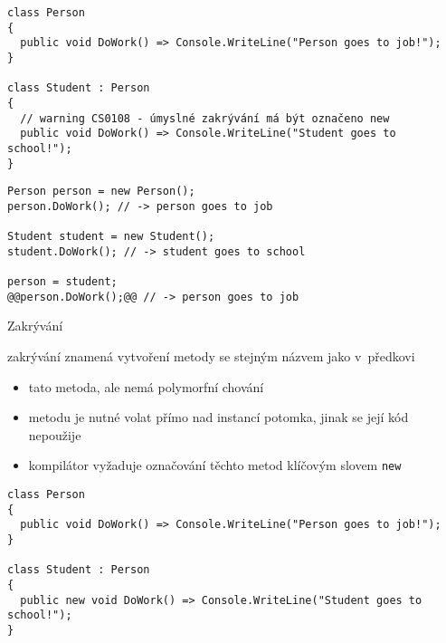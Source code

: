 \begin{frame}[fragile]
\begin{noblock}
\begin{lstlisting}[basicstyle=\small]
class Person
{
  public void DoWork() => Console.WriteLine("Person goes to job!");
}

class Student : Person
{
  // warning CS0108 - úmyslné zakrývání má být označeno new
  public void DoWork() => Console.WriteLine("Student goes to school!");
}
\end{lstlisting}
\end{noblock}
\vfill
\begin{yesblock}
\begin{lstlisting}[basicstyle=\small]
Person person = new Person();
person.DoWork(); // -> person goes to job

Student student = new Student();
student.DoWork(); // -> student goes to school

person = student;
@@person.DoWork();@@ // -> person goes to job 
\end{lstlisting}
\end{yesblock}
\end{frame}



\begin{frame}[fragile]
\begin{bitemize}{Zakrývání}
\item zakrývání znamená vytvoření metody se stejným názvem jako v~předkovi
\begin{itemize}
\item tato metoda, ale nemá polymorfní chování
\item metodu je nutné volat přímo nad instancí potomka, jinak se její kód nepoužije
\item kompilátor vyžaduje označování těchto metod klíčovým slovem \lstinline|new|
\end{itemize}
\end{bitemize}
\vfill
\begin{yesblock}
\begin{lstlisting}[basicstyle=\small]
class Person
{
  public void DoWork() => Console.WriteLine("Person goes to job!");
}

class Student : Person
{
  public new void DoWork() => Console.WriteLine("Student goes to school!");
}
\end{lstlisting}
\end{yesblock}
\end{frame}



